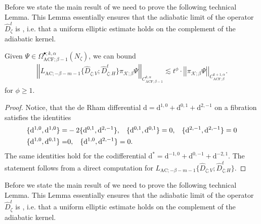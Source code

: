 \documentclass[psamsfonts]{amsart}
\theoremstyle{plain}
\theoremstyle{definition}{
\newtheorem{defi}{Definition}[section]
\newtheorem{ass}{Assumption}
\newtheorem*{nota}{Notation}}
\theoremstyle{remark}{
\newtheorem{rem}{Remark}
\newtheorem{ex}{Example}}
\theoremstyle{plain}{
\newtheorem{thm}{Theorem}[section]
\newtheorem{lem}{Lemma}[section]
\newtheorem{cor}{Corollary}[section]
\newtheorem{prop}{Proposition}[section]
\newtheorem{con}{Conjecture}[section]}
\newcommand{\m}[1]{{\mathrm{#1}}}
\begin{document}
Before we state the main result of \cite{majewskiDirac} we need to prove the following technical Lemma. This Lemma essentially ensures that the adiabatic limit of the operator $\widehat{D}^t_\zeta$ is , i.e. that a uniform elliptic estimate holds on the complement of the adiabatic kernel.

\begin{lem}
\label{valueofphi}
    Given $\Psi\in \Omega^{\bullet;k,\alpha}_{\m{ACF};\beta-1}(N_\zeta)$, we can bound
    \begin{align*}
        \left|\left|L_{\m{AC};-\beta-m-1}\{\widehat{D}_{\zeta;V};\widehat{D}^t_{\zeta;H}\}\pi_{\mathcal{K};\beta}\Psi\right|\right|_{C^{k,\alpha}_{\m{ACF};\beta-1}}\lesssim t^\phi\cdot\left|\left|\pi_{\mathcal{K};\beta}\Psi\right|\right|_{C^{k+1,\alpha}_{\m{ACF};\beta}}.
    \end{align*}
for $\phi\geq 1$.
\end{lem}

\begin{proof}
    Notice, that the de Rham differential $\m{d}=\m{d}^{1,0}+\m{d}^{0,1}+\m{d}^{2,-1}$ on a fibration satisfies the identities 
    \begin{align*}
        \{\m{d}^{1,0},\m{d}^{1,0}\}=&-2\{\m{d}^{0,1},\m{d}^{2,-1}\},\hspace{0.3cm}\{\m{d}^{0,1},\m{d}^{0,1}\}=0,\hspace{0.3cm}\{\m{d}^{2,-1},\m{d}^{2,-1}\}=0\\
        \{\m{d}^{1,0},\m{d}^{0,1}\}=&0,\hspace{0.3cm}\{\m{d}^{1,0},\m{d}^{2,-1}\}=0.
    \end{align*}
    The same identities hold for the codifferential $\m{d}^*=\m{d}^{-1,0}+\m{d}^{0,-1}+\m{d}^{-2,1}$. The statement follows from a direct computation for $L_{\m{AC};-\beta-m-1}\{\widehat{D}_{\zeta;V};\widehat{D}^t_{\zeta;H}\}$.
\end{proof}

Before we state the main result of \cite{majewskiDirac} we need to prove the following technical Lemma. This Lemma essentially ensures that the adiabatic limit of the operator $\widehat{D}^t_\zeta$ is , i.e. that a uniform elliptic estimate holds on the complement of the adiabatic kernel.
\end{document}
